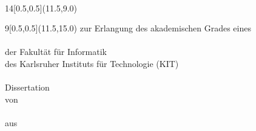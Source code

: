 \begin{titlepage}
\thispagestyle{empty}

%
\mbox{}\vspace{4\baselineskip}\\
 	\begin{textblock}{14}[0.5,0.5](11.5,9.0)
		\sffamily%
		\huge%
 		\Centering%
		\textbf{\WorkTitle}
 	\end{textblock}

	\begin{textblock}{9}[0.5,0.5](11.5,15.0)
 		\sffamily
		\Centering
		zur Erlangung des akademischen Grades eines
		\vspace{0.5\baselineskip}\\%
		\Large
		\DocDegree
		\vspace{1\baselineskip}\\%
		\normalsize
		der Fakultät für Informatik\texorpdfstring{\\}{}
		des Karlsruher Instituts für Technologie (KIT)
		\vspace{0.75\baselineskip}\\%
		\textbf{\DissStatus}
		\vspace{0.5\baselineskip}\\%
		\Large
		{Dissertation}%
		\vspace{0.5\baselineskip}\\%
		\normalsize
		von
		\vspace{0.5\baselineskip}\\%
		\Large
		\textbf{\AuthorName}%
		\vspace{0.5\baselineskip}\\%
		\normalsize
		aus \PlaceOfBirth%
 	\end{textblock}

	

\end{titlepage}
